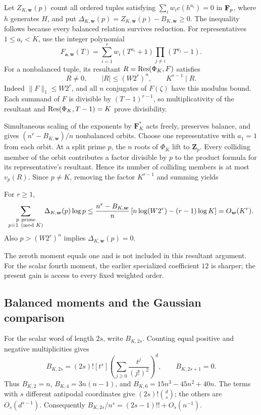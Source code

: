 Let $Z_{K,\boldsymbol w}(p)$ count all ordered tuples satisfying
$\sum_iw_ic(h^{a_i})=0$ in $\mathbf F_p$, where $h$ generates $H$, and put
$\Delta_{K,\boldsymbol w}(p)=Z_{K,\boldsymbol w}(p)-B_{K,\boldsymbol w}\ge0$.
The inequality follows because every balanced relation survives reduction.
For representatives $1\le a_i<K$, use the integer polynomial
\[
 F_{\boldsymbol a,\boldsymbol w}(T)
 =\sum_{i=1}^r w_i(T^{a_i}+1)\prod_{j\ne i}(T^{a_j}-1).
\]
For a nonbalanced tuple, its resultant $R=\operatorname{Res}(\Phi_K,F)$ satisfies
\begin{equation}
 R\ne0,\qquad |R|\le(W2^r)^n,\qquad K^{r-1}\mid R.
 \label{eq:cayley-allorder-norm}
\end{equation}
Indeed $\|F\|_1\le W2^r$, and all $n$ conjugates of $F(\zeta)$ have this
modulus bound. Each summand of $F$ is divisible by $(T-1)^{r-1}$, so
multiplicativity of the resultant and $\operatorname{Res}(\Phi_K,T-1)=K$ prove divisibility.

Simultaneous scaling of the exponents by $\mathbf F_K^*$ acts freely,
preserves balance, and gives $(n^r-B_{K,\boldsymbol w})/n$ nonbalanced orbits.
Choose one representative with $a_1=1$ from each orbit.
At a split prime $p$, the $n$ roots of $\Phi_K$ lift to $\mathbf Z_p$.
Every colliding member of the orbit contributes a factor divisible by $p$
to the product formula for its representative's resultant. Hence its number
of colliding members is at most $v_p(R)$.
Since $p\ne K$, removing the factor $K^{r-1}$ and summing yields
\begin{proposition}
For $r\ge1$,
\begin{equation}
 \sum_{\substack{p\ {\rm prime}\\p\equiv1\pmod K}}
 \Delta_{K,\boldsymbol w}(p)\log p
 \le\frac{n^r-B_{K,\boldsymbol w}}n
 \left[n\log(W2^r)-(r-1)\log K\right]
 =O_{\boldsymbol w}(K^r).
 \label{eq:cayley-allorder-budget}
\end{equation}
Also $p>(W2^r)^n$ implies $\Delta_{K,\boldsymbol w}(p)=0$.
\end{proposition}
The zeroth moment equals one and is not included in this resultant argument.
For the scalar fourth moment, the earlier specialized coefficient $12$
is sharper; the present gain is access to every fixed weighted order.

\subsection{Balanced moments and the Gaussian comparison}
For the scalar word of length $2s$, write $B_{K,2s}$. Counting equal positive
and negative multiplicities gives
\[
 B_{K,2s}=(2s)![t^s]\left(\sum_{j\ge0}\frac{t^j}{(j!)^2}\right)^d,
 \qquad B_{K,2s+1}=0.
\]
Thus $B_{K,2}=n$, $B_{K,4}=3n(n-1)$, and
$B_{K,6}=15n^3-45n^2+40n$. The terms with $s$ different antipodal
coordinates give $(2s)!\binom ds$; the others are $O_s(d^{s-1})$.
Consequently $B_{K,2s}/n^s=(2s-1)!!+O_s(n^{-1})$.

